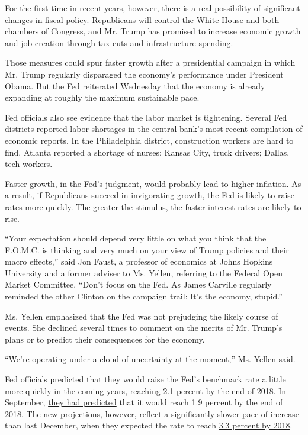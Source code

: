 For the first time in recent years, however, there is a real possibility
of significant changes in fiscal policy. Republicans will control the
White House and both chambers of Congress, and Mr. Trump has promised to
increase economic growth and job creation through tax cuts and
infrastructure spending.

Those measures could spur faster growth after a presidential campaign in
which Mr. Trump regularly disparaged the economy's performance under
President Obama. But the Fed reiterated Wednesday that the economy is
already expanding at roughly the maximum sustainable pace.

Fed officials also see evidence that the labor market is tightening.
Several Fed districts reported labor shortages in the central bank's
\href{https://www.federalreserve.gov/monetarypolicy/beigebook/beigebook201611.htm}{most
recent compilation} of economic reports. In the Philadelphia district,
construction workers are hard to find. Atlanta reported a shortage of
nurses; Kansas City, truck drivers; Dallas, tech workers.

Faster growth, in the Fed's judgment, would probably lead to higher
inflation. As a result, if Republicans succeed in invigorating growth,
the Fed
\href{http://www.nytimes.com/2016/12/13/business/economy/federal-reserve-interest-rates.html}{is
likely to raise rates more quickly}. The greater the stimulus, the
faster interest rates are likely to rise.

``Your expectation should depend very little on what you think that the
F.O.M.C. is thinking and very much on your view of Trump policies and
their macro effects,'' said Jon Faust, a professor of economics at Johns
Hopkins University and a former adviser to Ms. Yellen, referring to the
Federal Open Market Committee. ``Don't focus on the Fed. As James
Carville regularly reminded the other Clinton on the campaign trail:
It's the economy, stupid.''

Ms. Yellen emphasized that the Fed was not prejudging the likely course
of events. She declined several times to comment on the merits of Mr.
Trump's plans or to predict their consequences for the economy.

``We're operating under a cloud of uncertainty at the moment,'' Ms.
Yellen said.

Fed officials predicted that they would raise the Fed's benchmark rate a
little more quickly in the coming years, reaching 2.1 percent by the end
of 2018. In September,
\href{https://www.federalreserve.gov/monetarypolicy/files/fomcprojtabl20160921.pdf}{they
had predicted} that it would reach 1.9 percent by the end of 2018. The
new projections, however, reflect a significantly slower pace of
increase than last December, when they expected the rate to reach
\href{https://www.federalreserve.gov/monetarypolicy/files/fomcprojtabl20151216.pdf}{3.3
percent by 2018}.

